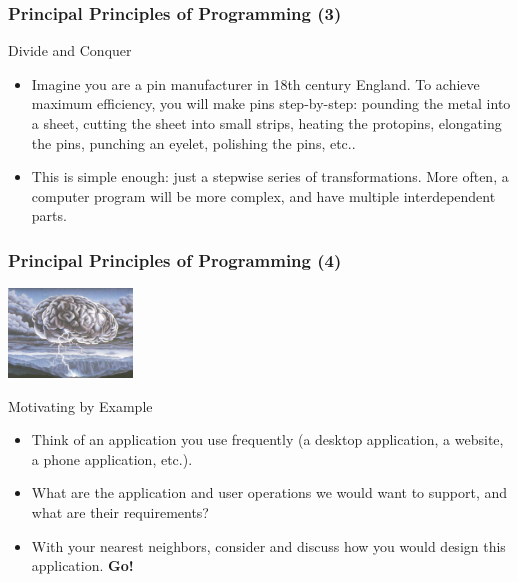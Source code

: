 \documentclass[10pt]{beamer}
\begin{document}
\begin{frame}
  \frametitle{Principal Principles of Programming (3)}
  \begin{block}{Divide and Conquer}
    \begin{itemize}
      \item Imagine you are a pin manufacturer in 18th century England.
        To achieve maximum efficiency, you will make pins step-by-step: pounding the metal into a sheet, cutting the sheet into small strips, heating the protopins, elongating the pins, punching an eyelet, polishing the pins, etc..
      \item This is simple enough: just a stepwise series of transformations.
        More often, a computer program will be more complex, and have multiple interdependent parts.
    \end{itemize}
  \end{block}
\end{frame}

\begin{frame}
  \frametitle{Principal Principles of Programming (4)}
  \centering
  \vspace{10px}
  \includegraphics[width=125px]{Brainstorm.jpg}
  \vspace{5px}
  \begin{block}{Motivating by Example}
    \begin{itemize}
      \item Think of an application you use frequently (a desktop application, a website, a phone application, etc.).
      \item What are the application and user operations we would want to support, and what are their requirements?
      \item With your nearest neighbors, consider and discuss how you would design this application.
        \textbf{Go!}
    \end{itemize}
  \end{block}
\end{frame}
\end{document}
